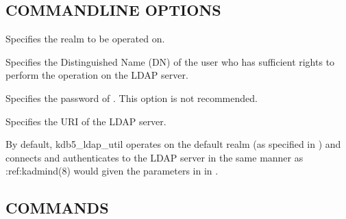 \documentclass[letterpaper,10pt,english]{sphinxmanual}
\begin{document}
\subsection{COMMAND\sphinxhyphen{}LINE OPTIONS}
\label{\detokenize{admin/admin_commands/kdb5_ldap_util:command-line-options}}\label{\detokenize{admin/admin_commands/kdb5_ldap_util:kdb5-ldap-util-options}}\begin{description}
\sphinxAtStartPar
Specifies the realm to be operated on.

\sphinxAtStartPar
Specifies the Distinguished Name (DN) of the user who has
sufficient rights to perform the operation on the LDAP server.

\sphinxAtStartPar
Specifies the password of .  This option is not
recommended.

\sphinxAtStartPar
Specifies the URI of the LDAP server.

\end{description}

\sphinxAtStartPar
By default, kdb5\_ldap\_util operates on the default realm (as specified
in {\hyperref[\detokenize{admin/conf_files/krb5_conf:krb5-conf-5}]{}}) and connects and authenticates to the LDAP
server in the same manner as :ref:kadmind(8)\textasciigrave{} would given the
parameters in {\hyperref[\detokenize{admin/conf_files/kdc_conf:dbdefaults}]{}} in {\hyperref[\detokenize{admin/conf_files/kdc_conf:kdc-conf-5}]{}}.


\subsection{COMMANDS}
\label{\detokenize{admin/admin_commands/kdb5_ldap_util:commands}}\label{\detokenize{admin/admin_commands/kdb5_ldap_util:kdb5-ldap-util-options-end}}
\end{document}

